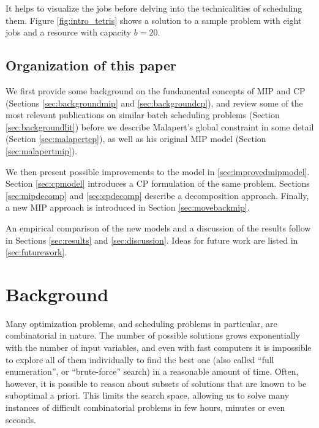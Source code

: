 \documentclass[13pt, letterpaper, oneside]{book}
\begin{document}
It helps to visualize the jobs before delving into the technicalities of
scheduling them. Figure \ref{fig:intro_tetris} shows a solution to a sample
problem with eight jobs and a resource with capacity $b = 20$.


\section{Organization of this paper}
We first provide some background on the fundamental concepts of MIP and CP
(Sections \ref{sec:backgroundmip} and \ref{sec:backgroundcp}), and
review some of the most relevant publications on similar batch scheduling
problems (Section \ref{sec:backgroundlit}) before we describe Malapert's global
constraint in some detail (Section \ref{sec:malapertcp}), as well as his
original MIP model (Section \ref{sec:malapertmip}).

We then present possible improvements to the
model in \ref{sec:improvedmipmodel}. Section \ref{sec:cpmodel} introduces a CP
formulation of the same problem. Sections \ref{sec:mipdecomp} and
\ref{sec:cpdecomp} describe a decomposition approach. Finally, a new MIP approach
is introduced in Section \ref{sec:movebackmip}.

An empirical comparison of the new models and a discussion of the results follow in
Sections \ref{sec:results} and \ref{sec:discussion}. Ideas for future work are
listed in \ref{sec:futurework}.


\chapter{Background}
Many optimization problems, and scheduling problems in particular, are
combinatorial in nature. The number of possible solutions grows exponentially
with the number of input variables, and even with fast computers it is
impossible to explore all of them individually to find the best one
(also called ``full enumeration'', or ``brute-force'' search) in a reasonable
amount of time. Often, however, it is possible to reason about subsets of
solutions that are known to be suboptimal a priori. This limits the search
space, allowing us to solve many instances of difficult combinatorial problems
in few hours, minutes or even seconds.
\end{document}
